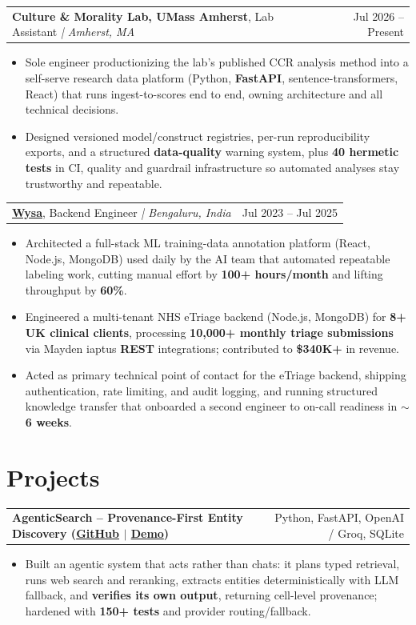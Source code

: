 \documentclass[letterpaper,11pt]{article}
\makeatletter
\newcommand{\expItem}[4]{%
  \vspace{2pt}
  \begin{tabular*}{\textwidth}{@{}l@{\extracolsep{\fill}}r@{}}
    \textbf{#1}, #2 \textit{| #3} & #4 \\
  \end{tabular*}\par\vspace{-3pt}
}
\newcommand{\projItem}[2]{%
  \vspace{2pt}
  \begin{tabular*}{\textwidth}{@{}l@{\extracolsep{\fill}}r@{}}
    \textbf{#1} & #2 \\
  \end{tabular*}\par\vspace{-3pt}
}
\makeatother
\begin{document}
\expItem{Culture \& Morality Lab, UMass Amherst}{Lab Assistant}{Amherst, MA}{Jul 2026 -- Present}
\begin{itemize}
  \item Sole engineer productionizing the lab's published CCR analysis method into a self-serve research data platform (Python, \textbf{FastAPI}, sentence-transformers, React) that runs ingest-to-scores end to end, owning architecture and all technical decisions.
  \item Designed versioned model/construct registries, per-run reproducibility exports, and a structured \textbf{data-quality} warning system, plus \textbf{40 hermetic tests} in CI, quality and guardrail infrastructure so automated analyses stay trustworthy and repeatable.
\end{itemize}

\expItem{\href{https://www.wysa.io}{Wysa}}{Backend Engineer}{Bengaluru, India}{Jul 2023 -- Jul 2025}
\begin{itemize}
  \item Architected a full-stack ML training-data annotation platform (React, Node.js, MongoDB) used daily by the AI team that automated repeatable labeling work, cutting manual effort by \textbf{100+ hours/month} and lifting throughput by \textbf{60\%}.
  \item Engineered a multi-tenant NHS eTriage backend (Node.js, MongoDB) for \textbf{8+ UK clinical clients}, processing \textbf{10{,}000+ monthly triage submissions} via Mayden iaptus \textbf{REST} integrations; contributed to \textbf{\$340K+} in revenue.
  \item Acted as primary technical point of contact for the eTriage backend, shipping authentication, rate limiting, and audit logging, and running structured knowledge transfer that onboarded a second engineer to on-call readiness in \textbf{$\sim$6 weeks}.
\end{itemize}

\section{Projects}

\projItem{AgenticSearch -- Provenance-First Entity Discovery {\normalfont\small(\href{https://github.com/Deva-1903/ciir_agentic_search}{GitHub} $\vert$ \href{https://agentic-search-negglszkwa-uc.a.run.app}{Demo})}}{Python, FastAPI, OpenAI / Groq, SQLite}
\begin{itemize}
  \item Built an agentic system that acts rather than chats: it plans typed retrieval, runs web search and reranking, extracts entities deterministically with LLM fallback, and \textbf{verifies its own output}, returning cell-level provenance; hardened with \textbf{150+ tests} and provider routing/fallback.
\end{itemize}
\end{document}
